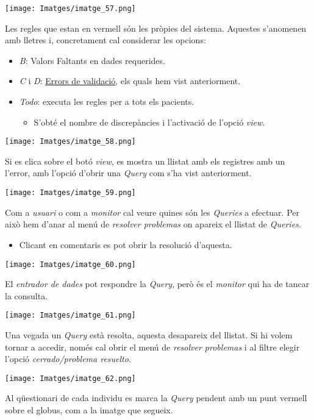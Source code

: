 \documentclass[
]{article}
\providecommand{\tightlist}{%
  \setlength{\itemsep}{0pt}\setlength{\parskip}{0pt}}
\begin{document}
\texttt{[image: Imatges/imatge\_57.png]}

Les regles que estan en vermell són les pròpies del sistema. Aquestes s'anomenen amb lletres i, concretament cal considerar les opcions:

\begin{itemize}
\tightlist
\item
  \emph{B}: Valors Faltants en dades requerides.
\item
  \emph{C} i \emph{D}: \protect\hyperlink{en5}{Errors de validació}, els quals hem vist anteriorment.
\item
  \emph{Todo}: executa les regles per a tots els pacients.

  \begin{itemize}
  \tightlist
  \item
    S'obté el nombre de discrepàncies i l'activació de l'opció \emph{view}.
  \end{itemize}
\end{itemize}

\texttt{[image: Imatges/imatge\_58.png]}

Si es clica sobre el botó \emph{view}, es mostra un llistat amb els registres amb un l'error, amb l'opció d'obrir una \emph{Query} com s'ha vist anteriorment.

\texttt{[image: Imatges/imatge\_59.png]}

Com a \emph{usuari} o com a \emph{monitor} cal veure quines són les \emph{Queries} a efectuar. Per això hem d'anar al menú de \emph{resolver problemas} on apareix el llistat de \emph{Queries}.

\begin{itemize}
\tightlist
\item
  Clicant en comentaris es pot obrir la resolució d'aquesta.
\end{itemize}

\texttt{[image: Imatges/imatge\_60.png]}

El \emph{entrador de dades} pot respondre la \emph{Query}, però és el \emph{monitor} qui ha de tancar la consulta.

\texttt{[image: Imatges/imatge\_61.png]}

Una vegada un \emph{Query} està resolta, aquesta desapareix del llistat. Si hi volem tornar a accedir, només cal obrir el menú de \emph{resolver problemas} i al filtre elegir l'opció \emph{cerrado/problema resuelto}.

\texttt{[image: Imatges/imatge\_62.png]}

Al qüestionari de cada individu es marca la \emph{Query} pendent amb un punt vermell sobre el globus, com a la imatge que segueix.
\end{document}

